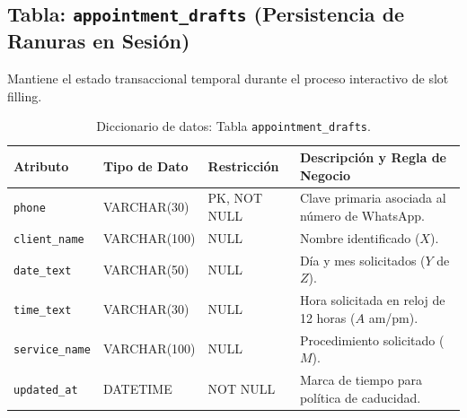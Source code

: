 \documentclass[12pt,a4paper]{report}
\begin{document}
\subsection{Tabla: \texttt{appointment\_drafts} (Persistencia de Ranuras en Sesión)}
Mantiene el estado transaccional temporal durante el proceso interactivo de slot filling.
\begin{table}[h!]
\centering
\small
\begin{tabularx}{\textwidth}{|p{2.6cm}|p{2.9cm}|p{2.4cm}|X|}
\hline
\rowcolor{BrandPrimary!20}
\textbf{Atributo} & \textbf{Tipo de Dato} & \textbf{Restricción} & \textbf{Descripción y Regla de Negocio} \\
\hline
\texttt{phone} & VARCHAR(30) & PK, NOT NULL & Clave primaria asociada al número de WhatsApp. \\
\hline
\texttt{client\_name} & VARCHAR(100) & NULL & Nombre identificado ($X$). \\
\hline
\texttt{date\_text} & VARCHAR(50) & NULL & Día y mes solicitados ($Y$ de $Z$). \\
\hline
\texttt{time\_text} & VARCHAR(30) & NULL & Hora solicitada en reloj de 12 horas ($A$ am/pm). \\
\hline
\texttt{service\_name}& VARCHAR(100) & NULL & Procedimiento solicitado ($M$). \\
\hline
\texttt{updated\_at} & DATETIME & NOT NULL & Marca de tiempo para política de caducidad. \\
\hline
\end{tabularx}
\caption{Diccionario de datos: Tabla \texttt{appointment\_drafts}.}
\label{tab:dic_drafts}
\end{table}
\end{document}
